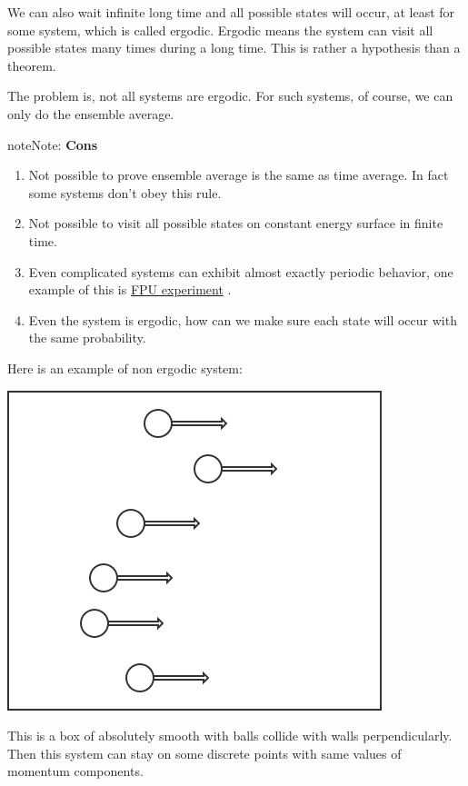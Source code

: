 \documentclass[letterpaper,10pt,english]{sphinxmanual}
\begin{document}
We can also wait infinite long time and all possible states will occur, at least for some system, which is called ergodic. Ergodic means the system can visit all possible states many times during a long time. This is rather a hypothesis than a theorem.

The problem is, not all systems are ergodic. For such systems, of course, we can only do the ensemble average.

\begin{notice}{note}{Note:}
\textbf{Cons}
\begin{enumerate}
\item {} 
Not possible to prove ensemble average is the same as time average. In fact some systems don't obey this rule.

\item {} 
Not possible to visit all possible states on constant energy surface in finite time.

\item {} 
Even complicated systems can exhibit almost exactly periodic behavior, one example of this is \href{https://en.wikipedia.org/wiki/Fermi\%E2\%80\%93Pasta\%E2\%80\%93Ulam\_problem}{FPU experiment} .

\item {} 
Even the system is ergodic, how can we make sure each state will occur with the same probability.

\end{enumerate}

Here is an example of non ergodic system:

{\hfill\includegraphics{non-ergodic.png}\hfill}

This is a box of absolutely smooth with balls collide with walls perpendicularly. Then this system can stay on some discrete points with same values of momentum components.


\end{notice}
\end{document}
